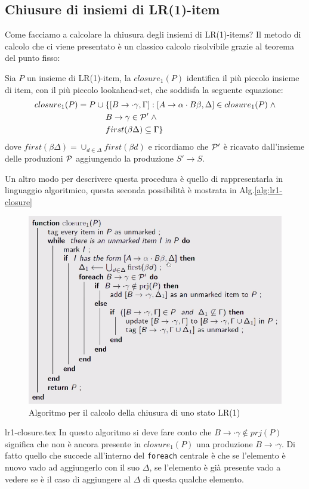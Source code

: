 \documentclass[class=book, crop=false, oneside, 12pt]{standalone}
\begin{document}
\subsection{Chiusure di insiemi di LR(1)-item}
Come facciamo a calcolare la chiusura degli insiemi di LR(1)-items? Il metodo di calcolo che ci viene presentato è un classico calcolo risolvibile grazie al teorema del punto fisso:
\begin{definition}
    \label{def:lr1-closure}
    Sia \(P\) un insieme di LR(1)-item, la \(closure_1(P)\) identifica il più piccolo insieme di item, con il più piccolo lookahead-set, che soddisfa la seguente equazione:
    \begin{align*}
        closure_1(P) = P \; \cup \; &\{[B \rightarrow \cdot \gamma, \Gamma] : [A \rightarrow \alpha \cdot B \beta, \Delta] \in closure_1(P) \; \land \\ 
        & B \rightarrow \gamma \in \P' \; \land \\
        & first(\beta \Delta) \subseteq \Gamma\}
    \end{align*}  
    dove \(first(\beta \Delta) = \cup_{d \in \Delta} first(\beta d)\) e ricordiamo che \(\P'\) è ricavato dall'insieme delle produzioni \(\P\) aggiungendo la produzione \(S' \to S\).
\end{definition}
Un altro modo per descrivere questa procedura è quello di rappresentarla in linguaggio algoritmico, questa seconda possibilità è mostrata in Alg.\ref{alg:lr1-closure}
\begin{figure}[H]
    \centering
    \includegraphics[width=\textwidth,keepaspectratio]{alg_closure-lr1.png}
    \caption{Algoritmo per il calcolo della chiusura di uno stato LR(1)}
    \label{alg:closure-lr1}
\end{figure}
{lr1-closure.tex}
In questo algoritmo si deve fare conto che \(B \to \cdot \gamma \notin prj(P)\) significa che non è ancora presente in \(closure_1(P)\) una produzione \(B \to \cdot \gamma\).
Di fatto quello che succede all'interno del \texttt{foreach} centrale è che se l'elemento è nuovo vado ad aggiungerlo con il suo \(\Delta\), se l'elemento è già presente vado a vedere se è il caso di aggiungere al \(\Delta\) di questa qualche elemento.
\end{document}
